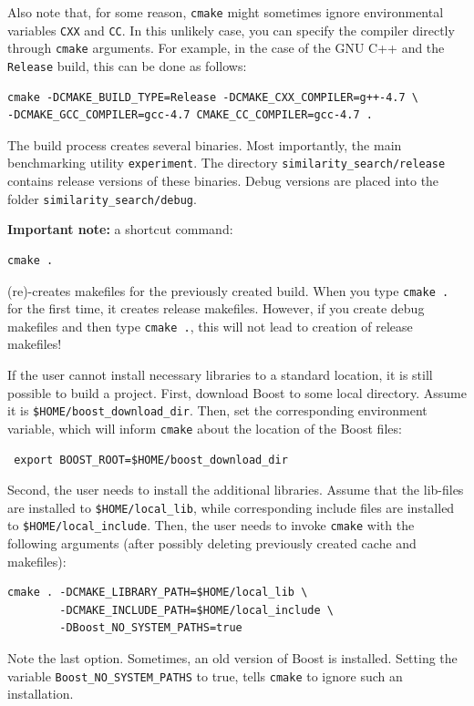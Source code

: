 \documentclass[runningheads,a4paper]{llncs}
\newcommand{\ttt}[1]{\texttt{#1}}
\begin{document}
{Also note that, for some reason, \ttt{cmake} might sometimes ignore environmental variables \ttt{CXX} and \ttt{CC}.
In this unlikely case, you can specify the compiler directly through \ttt{cmake} arguments.
For example, in the case of the GNU C++ and the \ttt{Release} build, 
this can be done as follows:
\begin{verbatim}
cmake -DCMAKE_BUILD_TYPE=Release -DCMAKE_CXX_COMPILER=g++-4.7 \
-DCMAKE_GCC_COMPILER=gcc-4.7 CMAKE_CC_COMPILER=gcc-4.7 .
\end{verbatim} 

The build process creates several binaries. Most importantly,
the main benchmarking utility \ttt{experiment}.
The directory \ttt{similarity\_search/release} contains release versions of
these binaries. Debug versions are placed into the folder \ttt{similarity\_search/debug}.

\textbf{Important note:} a shortcut command:
\begin{verbatim}
cmake .
\end{verbatim} 
(re)-creates makefiles for the previously 
created build. When you type \ttt{cmake .} for the first time,
it creates release makefiles. However, if you create debug
makefiles and then type \ttt{cmake .}, 
this will not lead to creation of release makefiles! 

If the user cannot install necessary libraries to a standard location, 
it is still possible to build a project.
First, download Boost to some local directory. 
Assume it is \ttt{\$HOME/boost\_download\_dir}.
Then, set the corresponding environment variable, which will inform \ttt{cmake}
about the location of the Boost files:
\begin{verbatim}
 export BOOST_ROOT=$HOME/boost_download_dir
\end{verbatim}

Second, the user needs to install the additional libraries. Assume that the
lib-files are installed to \ttt{\$HOME/local\_lib}, while corresponding include
files are installed to \ttt{\$HOME/local\_include}. Then, the user 
needs to invoke \ttt{cmake} with the following arguments (after possibly deleting previously
created cache and makefiles):
\begin{verbatim}
cmake . -DCMAKE_LIBRARY_PATH=$HOME/local_lib \
        -DCMAKE_INCLUDE_PATH=$HOME/local_include \ 
        -DBoost_NO_SYSTEM_PATHS=true
\end{verbatim}
Note the last option. Sometimes, an old version of Boost is installed. 
Setting the variable \ttt{Boost\_NO\_SYSTEM\_PATHS} to true,
tells \ttt{cmake} to ignore such an installation.

}
\end{document}
